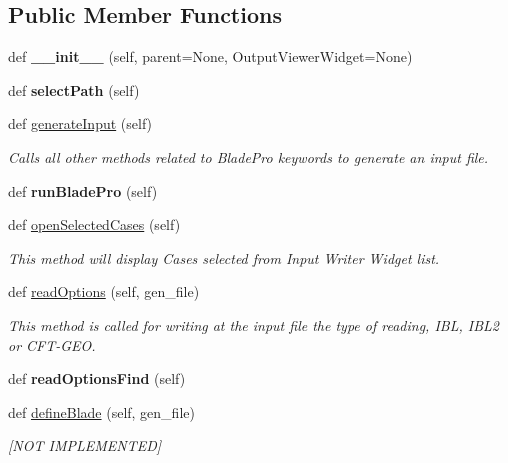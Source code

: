 \subsection*{Public Member Functions}
\begin{DoxyCompactItemize}
\item 
\hypertarget{a00071_a8b9718669dac6016ebe4e4f27421c7f2}{}\label{a00071_a8b9718669dac6016ebe4e4f27421c7f2} 
def {\bfseries \+\_\+\+\_\+init\+\_\+\+\_\+} (self, parent=None, Output\+Viewer\+Widget=None)
\item 
\hypertarget{a00071_a15eb2b878a78d644c96b19a5785d5428}{}\label{a00071_a15eb2b878a78d644c96b19a5785d5428} 
def {\bfseries select\+Path} (self)
\item 
def \hyperlink{a00071_a6ec74acbc44de3023188ddd8395b5b30}{generate\+Input} (self)
\begin{DoxyCompactList}\small\item\em Calls all other methods related to Blade\+Pro keywords to generate an input file. \end{DoxyCompactList}\item 
\hypertarget{a00071_a4f95b1c85e601bde79e5d4e1a526ef8b}{}\label{a00071_a4f95b1c85e601bde79e5d4e1a526ef8b} 
def {\bfseries run\+Blade\+Pro} (self)
\item 
def \hyperlink{a00071_af311095fe10adcca5237385033dfe67b}{open\+Selected\+Cases} (self)
\begin{DoxyCompactList}\small\item\em This method will display Cases selected from Input Writer Widget list. \end{DoxyCompactList}\item 
def \hyperlink{a00071_a7f4b3856d4dc973878dcbfd7697018bb}{read\+Options} (self, gen\+\_\+file)
\begin{DoxyCompactList}\small\item\em This method is called for writing at the input file the type of reading, I\+BL, I\+B\+L2 or C\+F\+T-\/\+G\+EO. \end{DoxyCompactList}\item 
\hypertarget{a00071_a3b0f9f0d1af5015219f258ad0751c778}{}\label{a00071_a3b0f9f0d1af5015219f258ad0751c778} 
def {\bfseries read\+Options\+Find} (self)
\item 
def \hyperlink{a00071_abf54bdb00a2743fb488463ab7247b146}{define\+Blade} (self, gen\+\_\+file)
\begin{DoxyCompactList}\small\item\em \mbox{[}N\+OT I\+M\+P\+L\+E\+M\+E\+N\+T\+ED\mbox{]} \end{DoxyCompactList}\item 

\end{DoxyCompactItemize}

